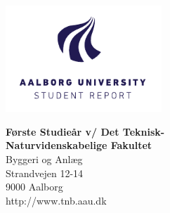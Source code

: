 {}
\thispagestyle{empty}

\begin{minipage}[t]{0.48\textwidth}
\vspace*{-25pt}			%
\includegraphics[height=4cm]{billeder/AAU-logo-stud-UK-RGB}
\end{minipage}
\hfill
\begin{minipage}[t]{0.48\textwidth}
{\small 
\textbf{Første Studieår v/ Det Teknisk-}\\
\textbf{Naturvidenskabelige Fakultet}  \\
Byggeri og Anlæg \\
Strandvejen 12-14 \\
9000 Aalborg \\
http://www.tnb.aau.dk}
\end{minipage}

\vspace*{1cm}

